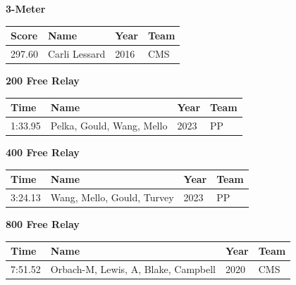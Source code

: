 \vspace{1.2em}
\noindent\begin{minipage}[t]{0.98\textwidth}
\centering
\textbf{\textcolor{teamprimary}{3-Meter}}\par
\vspace{0.5em}
\centering
\small
\renewcommand{\arraystretch}{1.0}
\setlength{\tabcolsep}{4pt}
\begin{tabular}{@{}p{2.5cm}p{4.5cm}p{1.5cm}p{2.5cm}@{}}
\toprule
\textbf{Score} & \textbf{Name} & \textbf{Year} & \textbf{Team} \\
\midrule
297.60 & Carli Lessard & 2016 & CMS \\
\bottomrule
\end{tabular}
\end{minipage}
\vspace{1.2em}
\noindent\begin{minipage}[t]{0.98\textwidth}
\centering
\textbf{\textcolor{teamprimary}{200 Free Relay}}\par
\vspace{0.5em}
\centering
\small
\renewcommand{\arraystretch}{1.0}
\setlength{\tabcolsep}{4pt}
\begin{tabular}{@{}p{2.7cm}p{4.3cm}p{1.6cm}p{2.7cm}@{}}
\toprule
\textbf{Time} & \textbf{Name} & \textbf{Year} & \textbf{Team} \\
\midrule
1:33.95 & Pelka, Gould, Wang, Mello & 2023 & PP \\
\bottomrule
\end{tabular}
\end{minipage}
\vspace{1.2em}
\noindent\begin{minipage}[t]{0.98\textwidth}
\centering
\textbf{\textcolor{teamprimary}{400 Free Relay}}\par
\vspace{0.5em}
\centering
\small
\renewcommand{\arraystretch}{1.0}
\setlength{\tabcolsep}{4pt}
\begin{tabular}{@{}p{2.7cm}p{4.3cm}p{1.6cm}p{2.7cm}@{}}
\toprule
\textbf{Time} & \textbf{Name} & \textbf{Year} & \textbf{Team} \\
\midrule
3:24.13 & Wang, Mello, Gould, Turvey & 2023 & PP \\
\bottomrule
\end{tabular}
\end{minipage}
\vspace{1.2em}
\noindent\begin{minipage}[t]{0.98\textwidth}
\centering
\textbf{\textcolor{teamprimary}{800 Free Relay}}\par
\vspace{0.5em}
\centering
\small
\renewcommand{\arraystretch}{1.0}
\setlength{\tabcolsep}{4pt}
\begin{tabular}{@{}p{2.7cm}p{4.3cm}p{1.6cm}p{2.7cm}@{}}
\toprule
\textbf{Time} & \textbf{Name} & \textbf{Year} & \textbf{Team} \\
\midrule
7:51.52 & Orbach-M, Lewis, A, Blake, Campbell & 2020 & CMS \\
\bottomrule
\end{tabular}
\end{minipage}
